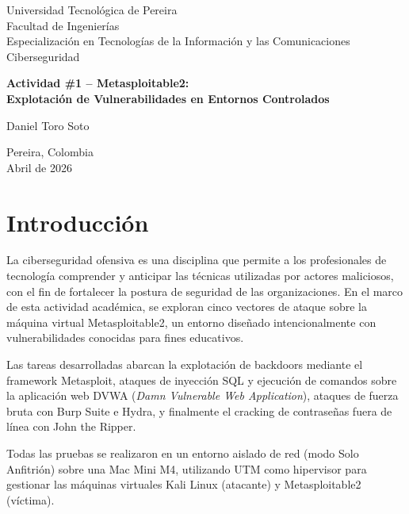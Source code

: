 \documentclass[12pt, letterpaper]{article}
\begin{document}
\begin{titlepage}
  \centering
  \vspace*{2cm}

  {\large Universidad Tecnológica de Pereira\\
  Facultad de Ingenierías\\
  Especialización en Tecnologías de la Información y las Comunicaciones\\[0.5em]
  Ciberseguridad}

  \vspace{3cm}

  {\LARGE \textbf{Actividad \#1 -- Metasploitable2:\\
  Explotación de Vulnerabilidades en Entornos Controlados}}

  \vspace{3cm}

  {\large Daniel Toro Soto}

  \vfill

  {\large Pereira, Colombia\\
  Abril de 2026}
\end{titlepage}

\tableofcontents
\newpage

\section{Introducción}

La ciberseguridad ofensiva es una disciplina que permite a los profesionales de tecnología comprender y anticipar las técnicas utilizadas por actores maliciosos, con el fin de fortalecer la postura de seguridad de las organizaciones. En el marco de esta actividad académica, se exploran cinco vectores de ataque sobre la máquina virtual Metasploitable2, un entorno diseñado intencionalmente con vulnerabilidades conocidas para fines educativos.

Las tareas desarrolladas abarcan la explotación de backdoors mediante el framework Metasploit, ataques de inyección SQL y ejecución de comandos sobre la aplicación web DVWA (\textit{Damn Vulnerable Web Application}), ataques de fuerza bruta con Burp Suite e Hydra, y finalmente el cracking de contraseñas fuera de línea con John the Ripper.

Todas las pruebas se realizaron en un entorno aislado de red (modo Solo Anfitrión) sobre una Mac Mini M4, utilizando UTM como hipervisor para gestionar las máquinas virtuales Kali Linux (atacante) y Metasploitable2 (víctima).
\end{document}
